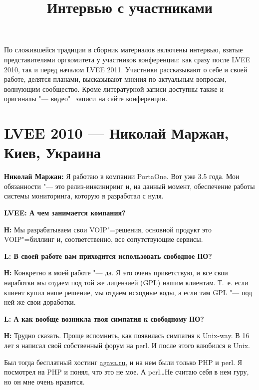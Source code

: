 \documentclass[10pt, a5paper]{article}
\begin{document}
\title{Интервью с участниками}
\date{}
\maketitle

По сложившейся традиции в сборник материалов включены интервью, взятые представителями оргкомитета у участников конференции: как сразу после LVEE 2010, так и перед началом LVEE 2011. Участники рассказывают о себе и своей работе, делятся планами, высказывают мнения по актуальным вопросам, волнующим сообщество. Кроме литературной записи доступны также и оригиналы "--- видео"=записи на сайте конференции.

\section*{\flushleft LVEE 2010 --- Николай Маржан, \linebreak Киев, Украина}

{\noindent \bf Николай Маржан:} Я работаю в компании PortaOne. Вот уже 3.5 года. Мои обязанности "--- это релиз-инжиниринг и, на данный момент, обеспечение работы системы мониторинга, которую я разработал с нуля.

{\noindent \bf LVEE: А чем занимается компания?}

{\noindent \bf Н:} Мы разрабатываем свои VOIP"=решения, основной продукт это VOIP"=биллинг и, соответственно, все сопутствующие сервисы.

{\noindent \bf L: В своей работе вам приходится использовать свободное ПО?}

{\noindent \bf Н:} Конкретно в моей работе "--- да. Я это очень приветствую, и все свои наработки мы отдаем под той же лицензией (GPL) нашим клиентам. Т.~е. если клиент купил наше решение, мы отдаем исходные коды, а если там GPL "--- под ней же свои доработки.

{\noindent \bf L: А как вообще возникла твоя симпатия к свободному ПО?}

{\noindent \bf Н:} Трудно сказать. Проще вспомнить, как появилась симпатия к Unix-way. В 16 лет я написал свой собственный форум на perl. И после этого влюбился в Unix. 

Был тогда бесплатный хостинг \url{agava.ru}, и на нем были только PHP и perl. Я посмотрел на PHP и понял, что это не мое. А perl\ldots Не считаю себя в нем гуру, но он мне очень нравится. 
\end{document}
